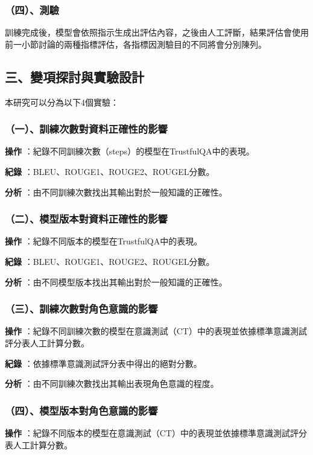 \documentclass[8pt,a4paper,MingLiU,UTF8]{article}
\def\xeCJKembold{0.4}
\def\saveCJKnode{\dimen255\lastkern}
\def\restoreCJKnode{\kern-\dimen255\kern\dimen255}
\let\CJKoldsymbol\CJKsymbol
\let\CJKoldpunctsymbol\CJKpunctsymbol
\def\CJKfakeboldsymbol#1{%
	\special{pdf:literal direct 2 Tr \xeCJKembold\space w}%
	\CJKoldsymbol{#1}%
	\saveCJKnode
	\special{pdf:literal direct 0 Tr}%
	\restoreCJKnode}
\def\CJKfakeboldpunctsymbol#1{%
	\special{pdf:literal direct 2 Tr \xeCJKembold\space w}%
	\CJKoldpunctsymbol{#1}%
	\saveCJKnode
	\special{pdf:literal direct 0 Tr}%
	\restoreCJKnode}
\newcommand\CJKfakebold[1]{%
	\let\CJKsymbol\CJKfakeboldsymbol
	\let\CJKpunctsymbol\CJKfakeboldpunctsymbol
	#1%
	\let\CJKsymbol\CJKoldsymbol
	\let\CJKpunctsymbol\CJKoldpunctsymbol}
\begin{document}
	\subsubsection{（四）、測驗}
	訓練完成後，模型會依照指示生成出評估內容，之後由人工評斷，結果評估會使用前一小節討論的兩種指標評估，各指標因測驗目的不同將會分別陳列。
	\subsection{三、變項探討與實驗設計}
	本研究可以分為以下4個實驗：
	\subsubsection{（一）、訓練次數對資料正確性的影響}
	\CJKfakebold{\textbf{操作}}：紀錄不同訓練次數（steps）的模型在TrustfulQA中的表現。
	
	\CJKfakebold{\textbf{紀錄}}：BLEU、ROUGE1、ROUGE2、ROUGEL分數。
	
	\CJKfakebold{\textbf{分析}}：由不同訓練次數找出其輸出對於一般知識的正確性。
	
	\subsubsection{（二）、模型版本對資料正確性的影響}
	\CJKfakebold{\textbf{操作}}：紀錄不同版本的模型在TrustfulQA中的表現。

	\CJKfakebold{\textbf{紀錄}}：BLEU、ROUGE1、ROUGE2、ROUGEL分數。

	\CJKfakebold{\textbf{分析}}：由不同模型版本找出其輸出對於一般知識的正確性。
	
	\subsubsection{（三）、訓練次數對角色意識的影響}
	\CJKfakebold{\textbf{操作}}：紀錄不同訓練次數的模型在意識測試（CT）中的表現並依據標準意識測試評分表人工計算分數。

	\CJKfakebold{\textbf{紀錄}}：依據標準意識測試評分表中得出的絕對分數。

	\CJKfakebold{\textbf{分析}}：由不同訓練次數找出其輸出表現角色意識的程度。
	
	\subsubsection{（四）、模型版本對角色意識的影響}
	\CJKfakebold{\textbf{操作}}：紀錄不同版本的模型在意識測試（CT）中的表現並依據標準意識測試評分表人工計算分數。
\end{document}
